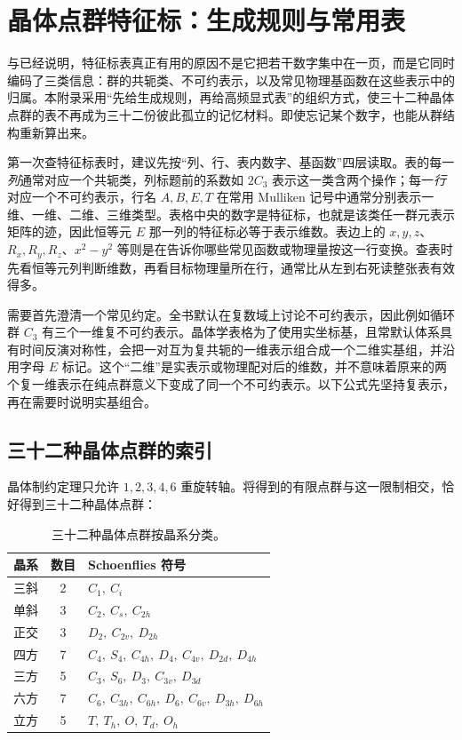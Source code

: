 \chapter{晶体点群特征标：生成规则与常用表}
\label{app:crystal-character-tables}

与已经说明，特征标表真正有用的原因不是它把若干数字集中在一页，而是它同时编码了三类信息：群的共轭类、不可约表示，以及常见物理基函数在这些表示中的归属。本附录采用“先给生成规则，再给高频显式表”的组织方式，使三十二种晶体点群的表不再成为三十二份彼此孤立的记忆材料。即使忘记某个数字，也能从群结构重新算出来。

第一次查特征标表时，建议先按“列、行、表内数字、基函数”四层读取。表的每一\emph{列}通常对应一个共轭类，列标题前的系数如 $2C_3$ 表示这一类含两个操作；每一\emph{行}对应一个不可约表示，行名 $A,B,E,T$ 在常用 Mulliken 记号中通常分别表示一维、一维、二维、三维类型。表格中央的数字是特征标，也就是该类任一群元表示矩阵的迹，因此恒等元 $E$ 那一列的特征标必等于表示维数。表边上的 $x,y,z$、$R_x,R_y,R_z$、$x^2-y^2$ 等则是在告诉你哪些常见函数或物理量按这一行变换。查表时先看恒等元列判断维数，再看目标物理量所在行，通常比从左到右死读整张表有效得多。

需要首先澄清一个常见约定。全书默认在复数域上讨论不可约表示，因此例如循环群 $C_3$ 有三个一维复不可约表示。晶体学表格为了使用实坐标基，且常默认体系具有时间反演对称性，会把一对互为复共轭的一维表示组合成一个二维实基组，并沿用字母 $E$ 标记。这个“二维”是实表示或物理配对后的维数，并不意味着原来的两个复一维表示在纯点群意义下变成了同一个不可约表示。以下公式先坚持复表示，再在需要时说明实基组合。

\section{三十二种晶体点群的索引}

晶体制约定理只允许 $1,2,3,4,6$ 重旋转轴。将得到的有限点群与这一限制相交，恰好得到三十二种晶体点群：

\begin{table}[htbp]
\centering
\caption{三十二种晶体点群按晶系分类。}
\label{tab:32-crystal-point-groups-app}
\begin{tabular}{ccl}
\toprule
晶系 & 数目 & Schoenflies 符号 \\
\midrule
三斜 & 2 & $C_1,\ C_i$ \\
单斜 & 3 & $C_2,\ C_s,\ C_{2h}$ \\
正交 & 3 & $D_2,\ C_{2v},\ D_{2h}$ \\
四方 & 7 & $C_4,\ S_4,\ C_{4h},\ D_4,\ C_{4v},\ D_{2d},\ D_{4h}$ \\
三方 & 5 & $C_3,\ S_6,\ D_3,\ C_{3v},\ D_{3d}$ \\
六方 & 7 & $C_6,\ C_{3h},\ C_{6h},\ D_6,\ C_{6v},\ D_{3h},\ D_{6h}$ \\
立方 & 5 & $T,\ T_h,\ O,\ T_d,\ O_h$ \\
\bottomrule
\end{tabular}
\end{table}

